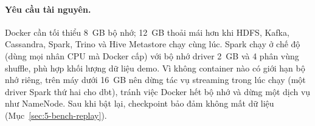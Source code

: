 \paragraph{Yêu cầu tài nguyên.} Docker cần tối thiểu 8~GB bộ nhớ; 12~GB thoải mái hơn khi HDFS, Kafka, Cassandra, Spark, Trino và Hive Metastore chạy cùng lúc. Spark chạy ở chế độ  (dùng mọi nhân CPU mà Docker cấp) với bộ nhớ driver 2~GB và 4 phân vùng shuffle, phù hợp khối lượng dữ liệu demo. Vì không container nào có giới hạn bộ nhớ riêng, trên máy dưới 16~GB nên dừng tác vụ streaming trong lúc chạy  (một driver Spark thứ hai cho dbt), tránh việc Docker hết bộ nhớ và dừng một dịch vụ như NameNode. Sau khi bật lại, checkpoint bảo đảm không mất dữ liệu (Mục~\ref{sec:5-bench-replay}).
